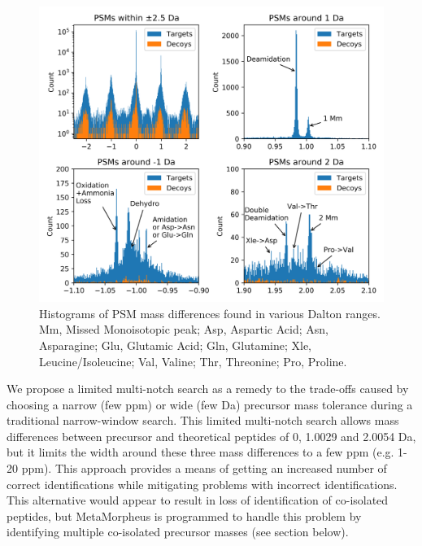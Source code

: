 \documentclass[journal=jprobs,manuscript=article]{achemso}
\begin{document}
\begin{figure}[H]
\includegraphics{fig4jurkat-1012.png}
\caption{Histograms of PSM mass differences found in various Dalton ranges. Mm, Missed Monoisotopic peak; Asp, Aspartic Acid; Asn, Asparagine; Glu, Glutamic Acid; Gln, Glutamine; Xle, Leucine/Isoleucine; Val, Valine; Thr, Threonine; Pro, Proline.}
\label{fig:fig4jurkat-1012}
\end{figure}

We propose a limited multi-notch search as a remedy to the trade-offs caused by choosing a narrow (few ppm) or wide (few Da) precursor mass tolerance during a traditional narrow-window search.
This limited multi-notch search allows mass differences between precursor and theoretical peptides of 0, 1.0029 and 2.0054 Da, but it limits the width around these three mass differences to a few ppm (e.g. 1-20 ppm).
This approach provides a means of getting an increased number of correct identifications while mitigating problems with incorrect identifications.
This alternative would appear to result in loss of identification of co-isolated peptides, but MetaMorpheus is programmed to handle this problem by identifying multiple co-isolated precursor masses (see section below).
\end{document}
